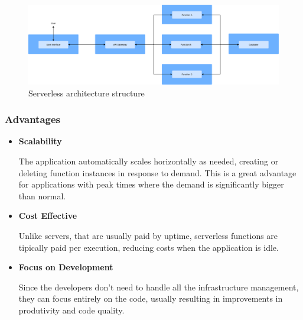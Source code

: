 \begin{figure}[htbp]
	\centering
	\includegraphics[width=\textwidth, height=0.5\textheight, keepaspectratio]{Chapters/Figures/Architectures/Serverless.pdf}
	\caption{Serverless architecture structure}
	\label{fig:architectures:serverless}
\end{figure}

\subsubsection{Advantages}
\begin{itemize}

	\item \textbf{Scalability}

	      The application automatically scales horizontally as needed, creating or
	      deleting function instances in response to demand. This is a great
	      advantage for applications with peak times where the demand is
	      significantly bigger than normal\cite{GoogleServerless}.

	\item \textbf{Cost Effective}

	      Unlike servers, that are usually paid by uptime, serverless functions are
	      tipically paid per execution, reducing costs when the application is idle\cite{s23104868}.

	\item \textbf{Focus on Development}

	      Since the developers don't need to handle all the infrastructure management,
	      they can focus entirely on the code, usually resulting in improvements in
	      produtivity and code quality\cite{GoogleServerless}.


\end{itemize}

